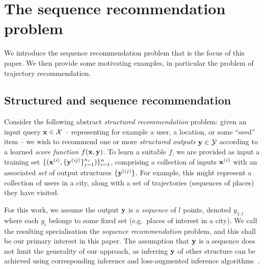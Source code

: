 
\secmoveup
\section{The sequence recommendation problem}
\label{sec:recseq}
\textmoveup

We introduce the sequence recommendation problem that is the focus of this paper.
We then provide some motivating examples, in particular the problem of trajectory recommendation.


%
%

%
\subsection{Structured and sequence recommendation}

Consider the following abstract
\emph{structured recommendation} problem:
given an input query $\mathbf{x} \in \mathcal{X}$ -- representing for example a user, a location, or some ``seed'' item --
we wish to recommend one or more \emph{structured outputs} $\mathbf{y} \in \mathcal{Y}$ according to a learned \emph{score function} $f(\mathbf{x},\mathbf{y})$.
To learn a suitable $f$,
we are provided as input a training set
$\{ ( \mathbf{x}^{({i})}, \{ \mathbf{y}^{({ij})} \}_{j=1}^{n_i} ) \}_{i=1}^{n}$,
comprising a collection of inputs $\mathbf{x}^{({i})}$ with an associated \emph{set} of output structures $\{ \mathbf{y}^{({ij})} \}$.
For example, this might represent a collection of users in a city, along with a set of trajectories (sequences of places) they have visited.

For this work, we assume the output $\mathbf{y}$ is a \emph{sequence} of $l$ points, denoted $y_{1:l}$
where each $y_i$ belongs to some fixed set (e.g.\ places of interest in a city).
We call the resulting specialisation the \emph{sequence recommendation} problem,
and this shall be our primary interest in this paper.
The assumption that $\mathbf{y}$ is a sequence does not limit the generality of our approach,
as inferring $\mathbf{y}$ of other structure can be achieved using corresponding inference and loss-augmented inference algorithms~\cite{joachims2009predicting}.  %


